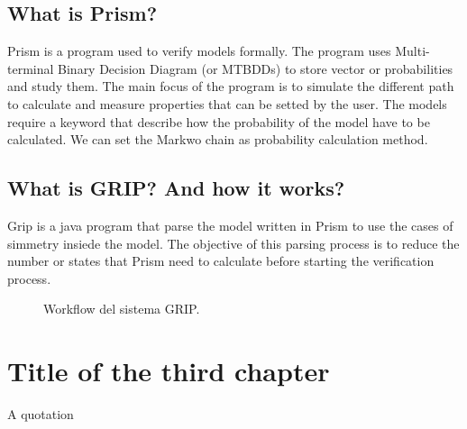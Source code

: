 \documentclass[a4paper,10 pt,titlepage,twoside]{book}
\numberwithin{equation}{chapter}
\theoremstyle{plain}
\theoremstyle{definition}
\DeclareMathOperator{\1}{\mathbb{1}}
\begin{document}
	\section*{What is Prism?}
	Prism is a program used to verify models formally. The program uses Multi-terminal Binary Decision Diagram (or MTBDDs) to store vector or probabilities and study them. The main focus of the program is to simulate the different path to calculate and measure properties that can be setted by the user. 
	The models require a keyword that describe how the probability of the model have to be calculated. We can set the Markwo chain as probability calculation method. 
	\section{What is GRIP? And how it works?}
	Grip is a java program that parse the model written in Prism to use the cases of simmetry insiede the model. The objective of this parsing process is to reduce the number or states that Prism need to calculate before starting the verification process. 
	
\begin{figure}[htbp]
	\centering
	\caption{Workflow del sistema GRIP.}
\end{figure}
	
	\chapter{Title of the third chapter}
	A quotation \cite{APS1}
	
\end{document}
